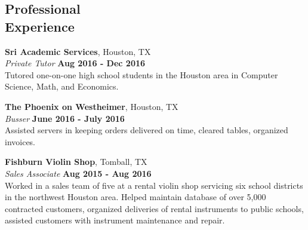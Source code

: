 \documentclass[margin,line]{resume}
\begin{document}
\begin{resume}
\section{\mysidestyle Professional\\Experience}

\textbf{Sri Academic Services}, Houston, TX \vspace{2mm}\\\vspace{1mm}%
\textsl{Private Tutor} \hfill \textbf{Aug 2016 - Dec 2016}\\
Tutored one-on-one high school students in the Houston area in Computer Science, Math, and Economics.

\textbf{The Phoenix on Westheimer}, Houston, TX \vspace{2mm}\\\vspace{1mm}%
\textsl{Busser} \hfill \textbf{June 2016 - July 2016}\\
Assisted servers in keeping orders delivered on time, cleared tables, organized invoices.

\textbf{Fishburn Violin Shop}, Tomball, TX \vspace{2mm}\\\vspace{1mm}%
\textsl{Sales Associate} \hfill \textbf{Aug 2015 -
Aug 2016}\\
Worked in a sales team of five at a rental violin shop servicing six school districts in the northwest Houston area.
Helped maintain database of over 5,000 contracted customers, organized deliveries of rental instruments to public schools, assisted customers with instrument maintenance and repair.
\vspace{1mm}%


\end{resume}
\end{document}
